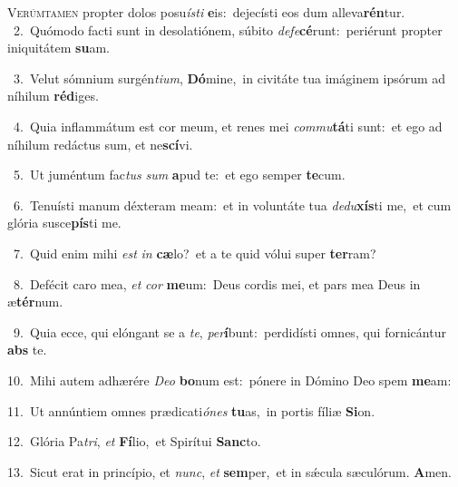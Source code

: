 \lettrine{\initial\textcolor{\initialcolor}{V}}{erúmtamen} propter dolos posu\-\textit{ís}\-\textit{ti} \textbf{e}\-is:~\star dejecísti eos dum alleva\-\textbf{rén}\-tur.\\
{\numbfont\textcolor{\numbcolor}{~2.}}~Quómodo facti sunt in desolatiónem, súbito \textit{de}\-\textit{fe}\textbf{cé}runt:~\star periérunt propter iniquitátem \textbf{su}\-am.\par
{\numbfont\textcolor{\numbcolor}{~3.}}~Velut sómnium surgén\-\textit{ti}\-\textit{um}, \textbf{Dó}\-mine,~\star in civitáte tua imáginem ipsórum ad níhilum \textbf{réd}\-iges.\par
{\numbfont\textcolor{\numbcolor}{~4.}}~Quia inflammátum est cor meum, et renes mei \textit{com}\-\textit{mu}\textbf{tá}ti sunt:~\star et ego ad níhilum redáctus sum, et ne\-\textbf{scí}\-vi.\par
{\numbfont\textcolor{\numbcolor}{~5.}}~Ut juméntum fac\textit{tus} \textit{sum} \textbf{a}\-pud te:~\star et ego semper \textbf{te}\-cum.\par
{\numbfont\textcolor{\numbcolor}{~6.}}~Tenuísti manum déxteram meam:~\dagger et in voluntáte tua \textit{de}\-\textit{du}\textbf{xís}ti me,~\star et cum glória susce\-\textbf{pís}\-ti me.\par
{\numbfont\textcolor{\numbcolor}{~7.}}~Quid enim mihi \textit{est} \textit{in} \textbf{cæ}\-lo?~\star et a te quid vólui super \textbf{ter}\-ram?\par
{\numbfont\textcolor{\numbcolor}{~8.}}~Defécit caro mea, \textit{et} \textit{cor} \textbf{me}\-um:~\star Deus cordis mei, et pars mea Deus in æ\-\textbf{tér}\-num.\par
{\numbfont\textcolor{\numbcolor}{~9.}}~Quia ecce, qui elóngant se a \textit{te}\-, \textit{per}\-\textbf{í}bunt:~\star perdidísti omnes, qui fornicántur \textbf{abs} te.\par
{\numbfont\textcolor{\numbcolor}{10.}}~Mihi autem adhærére \textit{De}\-\textit{o} \textbf{bo}\-num est:~\star pónere in Dómino Deo spem \textbf{me}\-am:\par
{\numbfont\textcolor{\numbcolor}{11.}}~Ut annúntiem omnes prædicati\-\textit{ó}\-\textit{nes} \textbf{tu}\-as,~\star in portis fíliæ \textbf{Si}\-on.\par
{\numbfont\textcolor{\numbcolor}{12.}}~Glória Pa\-\textit{tri}\-, \textit{et} \textbf{Fí}\-lio,~\star et Spirítui \textbf{Sanc}\-to.\par
{\numbfont\textcolor{\numbcolor}{13.}}~Sicut erat in princípio, et \textit{nunc}\-, \textit{et} \textbf{sem}\-per,~\star et in sǽcula sæculórum. \textbf{A}\-men.\par
